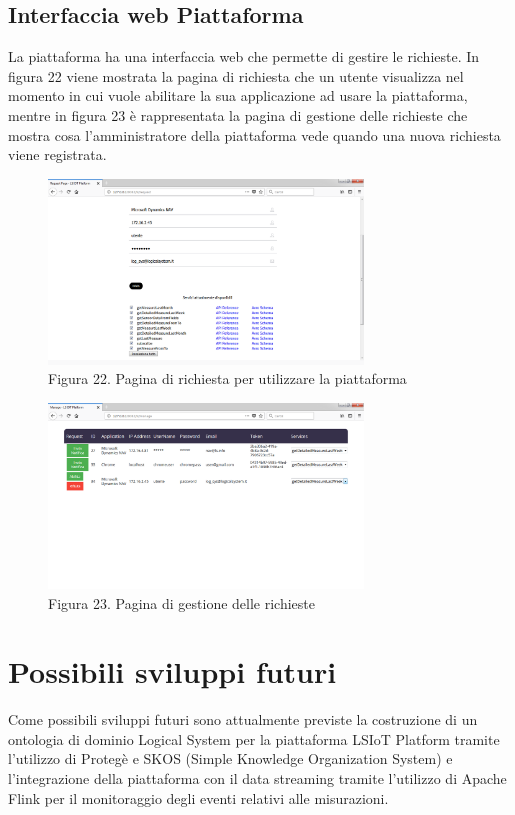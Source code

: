 \subsection{Interfaccia web Piattaforma}
La piattaforma ha una interfaccia web che permette di gestire le richieste. In figura 22 viene mostrata la pagina di richiesta che un utente visualizza nel momento in cui vuole abilitare la sua applicazione ad usare la piattaforma, mentre in figura 23 è rappresentata la pagina di gestione delle richieste che mostra cosa l'amministratore della piattaforma vede quando una nuova richiesta viene registrata.
\begin{figure}[h]
	\centering
	\includegraphics[width=0.75\textwidth]{pagina-di-richiesta.png}
	\caption*{Figura 22. Pagina di richiesta per utilizzare la piattaforma}
\end{figure}
\begin{figure}[h]
	\centering
	\includegraphics[width=0.75\textwidth]{gestione-delle-richieste.png}
	\caption*{Figura 23. Pagina di gestione delle richieste}
\end{figure}
\clearpage
\section{Possibili sviluppi futuri}
Come possibili sviluppi futuri sono attualmente previste la costruzione di un ontologia di dominio Logical System per la piattaforma LSIoT Platform tramite l'utilizzo di Protegè e SKOS (Simple Knowledge Organization System) e l'integrazione della piattaforma con il data streaming tramite l'utilizzo di Apache Flink per il monitoraggio degli eventi relativi alle misurazioni.
